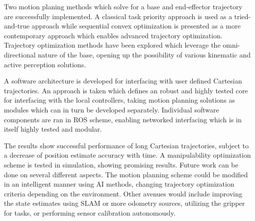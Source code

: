 \documentclass[times, utf8, diplomski, english]{fer}
\begin{document}
Two motion planing methods which solve for a base and end-effector trajectory are successfully implemented.
A classical task priority approach is used as a tried-and-true approach while sequential convex optimization is presented as a more contemporary approach which enables advanced trajectory optimization.
Trajectory optimization methods have been explored which leverage the omni-directional nature of the base, opening up the possibility of various kinematic and active perception solutions.

A software architecture is developed for interfacing with user defined Cartesian trajectories.
An approach is taken which defines an robust and highly tested core for interfacing with the local controllers, taking motion planning solutions as modules which can in turn be developed separately.
Individual software components are ran in ROS scheme, enabling networked interfacing which is in itself highly tested and modular.

The results show successful performance of long Cartesian trajectories, subject to a decrease of position estimate accuracy with time.
A manipulability optimization scheme is tested in simulation, showing promising results.
Future work can be done on several different aspects.
The motion planning scheme could be modified in an intelligent manner using AI methods, changing trajectory optimization criteria depending on the environment.
Other avenues would include improving the state estimates using SLAM or more odometry sources, utilizing the gripper for tasks, or performing sensor calibration autonomously.





\appendix
\end{document}

